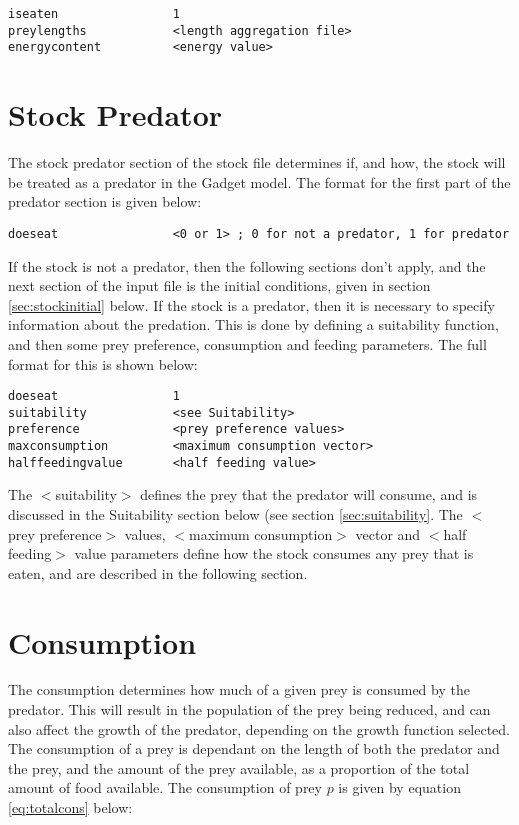 \documentclass[]{book}
\begin{document}
\begin{verbatim}
iseaten                1
preylengths            <length aggregation file>
energycontent          <energy value>
\end{verbatim}

\hypertarget{sec:stockpredator}{%
\section{Stock Predator}\label{sec:stockpredator}}

The stock predator section of the stock file determines if, and how, the
stock will be treated as a predator in the Gadget model. The format for
the first part of the predator section is given below:

\begin{verbatim}
doeseat                <0 or 1> ; 0 for not a predator, 1 for predator
\end{verbatim}

If the stock is not a predator, then the following sections don't apply,
and the next section of the input file is the initial conditions, given
in section \ref{sec:stockinitial} below. If the stock is a predator, then it
is necessary to specify information about the predation. This is done by
defining a suitability function, and then some prey preference,
consumption and feeding parameters. The full format for this is shown
below:

\begin{verbatim}
doeseat                1
suitability            <see Suitability>
preference             <prey preference values>
maxconsumption         <maximum consumption vector>
halffeedingvalue       <half feeding value>
\end{verbatim}

The \(<\)suitability\(>\) defines the prey that the predator will consume,
and is discussed in the Suitability section below (see
section \ref{sec:suitability}. The \(<\)prey preference\(>\) values,
\(<\)maximum consumption\(>\) vector and \(<\)half feeding\(>\) value parameters
define how the stock consumes any prey that is eaten, and are described
in the following section.

\hypertarget{sec:consumption}{%
\section{Consumption}\label{sec:consumption}}

The consumption determines how much of a given prey is consumed by the
predator. This will result in the population of the prey being reduced,
and can also affect the growth of the predator, depending on the growth
function selected. The consumption of a prey is dependant on the length
of both the predator and the prey, and the amount of the prey available,
as a proportion of the total amount of food available. The consumption
of prey \(p\) is given by
equation \eqref{eq:totalcons} below:
\end{document}
